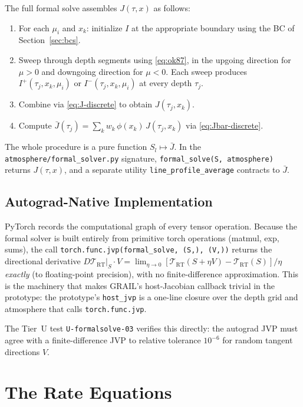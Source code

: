 \documentclass[11pt]{article}
\newcommand{\Tcyc}{\mathcal{T}}
\newcommand{\Trt}{\Tcyc_{\mathrm{RT}}}
\newcommand{\Jbar}{\bar{J}}
\newcommand{\Sl}{S_{l}}
\newcommand{\code}[1]{\texttt{#1}}
\begin{document}
The full formal solve assembles $J(\tau, x)$ as follows:
\begin{enumerate}
\item For each $\mu_i$ and $x_k$: initialize $I$ at the appropriate
boundary using the BC of Section~\ref{sec:bcs}.
\item Sweep through depth segments using \eqref{eq:ok87}, in the upgoing
direction for $\mu > 0$ and downgoing direction for $\mu < 0$. Each
sweep produces $I^+(\tau_j, x_k, \mu_i)$ or $I^-(\tau_j, x_k, \mu_i)$ at
every depth $\tau_j$.
\item Combine via \eqref{eq:J-discrete} to obtain $J(\tau_j, x_k)$.
\item Compute $\Jbar(\tau_j) = \sum_k w_k \,\phi(x_k)\, J(\tau_j, x_k)$ via
\eqref{eq:Jbar-discrete}.
\end{enumerate}
The whole procedure is a pure function $\Sl \mapsto \Jbar$.  In the
\code{atmosphere/formal\_solver.py} signature,
\code{formal\_solve(S, atmosphere)} returns $J(\tau, x)$, and a
separate utility \code{line\_profile\_average} contracts to $\Jbar$.

\subsection{Autograd-Native Implementation}

PyTorch records the computational graph of every tensor operation.
Because the formal solver is built entirely from primitive torch
operations (matmul, exp, sums), the call
\code{torch.func.jvp(formal\_solve, (S,), (V,))} returns the
directional derivative
$D\Trt|_S \cdot V = \lim_{\eta \to 0}[\Trt(S + \eta V) - \Trt(S)]/\eta$
\emph{exactly} (to floating-point precision), with no finite-difference
approximation.  This is the machinery that makes GRAIL's host-Jacobian
callback trivial in the prototype: the prototype's \code{host\_jvp} is
a one-line closure over the depth grid and atmosphere that calls
\code{torch.func.jvp}.

The Tier~U test \texttt{U-formalsolve-03} verifies this directly: the
autograd JVP must agree with a finite-difference JVP to relative
tolerance $10^{-6}$ for random tangent directions $V$.

\section{The Rate Equations}
\label{sec:rate-eqs}
\end{document}
